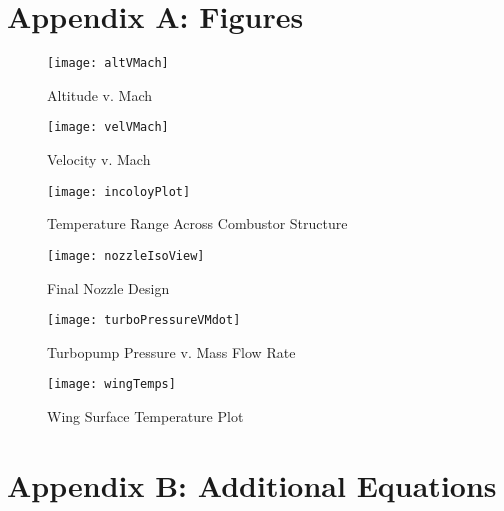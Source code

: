 \section{Appendix A: Figures}

\begin{figure}[H]
\begin{center}
\texttt{[image: altVMach]}
\caption{Altitude v. Mach}
\label{fig:altVMach}
\end{center}
\end{figure}

\begin{figure}[H]
\begin{center}
\texttt{[image: velVMach]}
\caption{Velocity v. Mach}
\label{fig:velVMach}
\end{center}
\end{figure}

\begin{figure}[H]
\begin{center}
\texttt{[image: incoloyPlot]}
\caption{Temperature Range Across Combustor Structure \cite{inco}}
\label{fig:incoloyPlot}
\end{center}
\end{figure}

\begin{figure}[H]
\begin{center}
\texttt{[image: nozzleIsoView]}
\caption{Final Nozzle Design}
\label{fig:nozzleIsoView}
\end{center}
\end{figure}

\begin{figure}[H]
\begin{center}
\texttt{[image: turboPressureVMdot]}
\caption{Turbopump Pressure v. Mass Flow Rate}
\label{fig:turboPressureVMdot}
\end{center}
\end{figure}


\begin{figure}[H]
\begin{center}
\texttt{[image: wingTemps]}
\caption{Wing Surface Temperature Plot}
\label{fig:wingTemps}
\end{center}
\end{figure}


\newpage
\section{Appendix B: Additional Equations}

